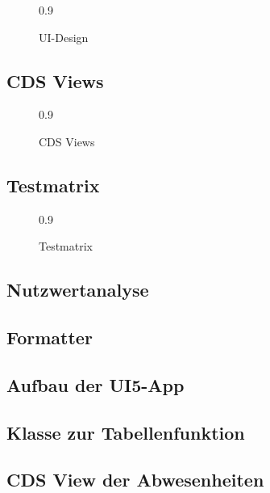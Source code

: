 \begin{figure}[htb]
\centering
{} {0.9}
\caption{UI-Design}
\label{fig:UI-Design}
\end{figure}

\subsection{CDS Views}
\label{app:CDS Views}
\begin{figure}[htb]
\centering
{} {0.9}
\caption{CDS Views}
\label{fig:CDS Views}
\end{figure}


\newpage
\subsection{Testmatrix}
\label{app:Testmatrix}

\begin{figure}[htb]
\centering
{} {0.9}
\caption{Testmatrix}
\label{fig:Testmatrix}
\end{figure}

\subsection{Nutzwertanalyse}
\label{app:Nutzwertanalyse}


\clearpage

\subsection{Formatter}
\label{app:Formatter}

\clearpage

\subsection{Aufbau der UI5-App}
\label{app:UI5-App}

\clearpage

\subsection{Klasse zur Tabellenfunktion}
\label{app:Klasse zur Tabellenfunktion}

\clearpage

\subsection{CDS View der Abwesenheiten}
\label{app:CDS View der Abwesenheiten}

\clearpage

